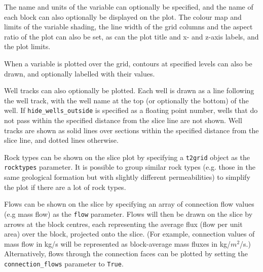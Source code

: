 The name and units of the variable can optionally be specified, and the name of each block can also optionally be displayed on the plot.  The colour map and limits of the variable shading, the line width of the grid columns and the aspect ratio of the plot can also be set, as can the plot title and x- and z-axis labels, and the plot limits.

When a variable is plotted over the grid, contours at specified levels can also be drawn, and optionally labelled with their values.

Well tracks can also optionally be plotted.  Each well is drawn as a line following the well track, with the well name at the top (or optionally the bottom) of the well.  If \texttt{hide\_wells\_outside} is specified as a floating point number, wells that do not pass within the specified distance from the slice line are not shown.  Well tracks are shown as solid lines over sections within the specified distance from the slice line, and dotted lines otherwise.

Rock types can be shown on the slice plot by specifying a \texttt{t2grid} object as the \texttt{rocktypes} parameter.  It is possible to group similar rock types (e.g. those in the same geological formation but with slightly different permeabilities) to simplify the plot if there are a lot of rock types.

Flows can be shown on the slice by specifying an array of connection flow values (e.g mass flow) as the \texttt{flow} parameter.  Flows will then be drawn on the slice by arrows at the block centres, each representing the average flux (flow per unit area) over the block, projected onto the slice.  (For example, connection values of mass flow in kg/s will be represented as block-average mass fluxes in kg/$m^2$/s.)  Alternatively, flows through the connection faces can be plotted by setting the \texttt{connection\_flows} parameter to \texttt{True}.

